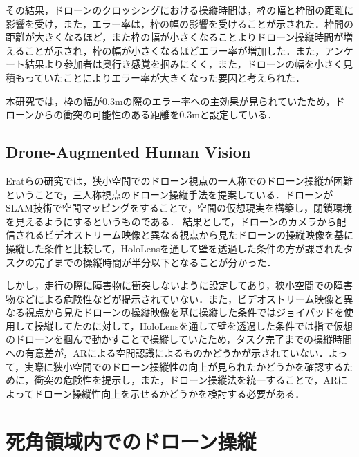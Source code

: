 \documentclass
[a4paper,11pt]{jreport}
\begin{document}
その結果，ドローンのクロッシングにおける操縦時間は，枠の幅と枠間の距離に影響を受け，また，エラー率は，枠の幅の影響を受けることが示された．枠間の距離が大きくなるほど，また枠の幅が小さくなることよりドローン操縦時間が増えることが示され，枠の幅が小さくなるほどエラー率が増加した．また，アンケート結果より参加者は奥行き感覚を掴みにくく，また，ドローンの幅を小さく見積もっていたことによりエラー率が大きくなった要因と考えられた．

本研究では，枠の幅が0.3mの際のエラー率への主効果が見られていたため，ドローンからの衝突の可能性のある距離を0.3mと設定している．

\section{Drone-Augmented Human Vision}
Eratらの研究では，狭小空間でのドローン視点の一人称でのドローン操縦が困難ということで，三人称視点のドローン操縦手法を提案している\cite{AR_drone}．ドローンがSLAM技術で空間マッピングをすることで，空間の仮想現実を構築し，閉鎖環境を見えるようにするというものである．
結果として，ドローンのカメラから配信されるビデオストリーム映像と異なる視点から見たドローンの操縦映像を基に操縦した条件と比較して，HoloLensを通して壁を透過した条件の方が課されたタスクの完了までの操縦時間が半分以下となることが分かった．

しかし，走行の際に障害物に衝突しないように設定してあり，狭小空間での障害物などによる危険性などが提示されていない．また，ビデオストリーム映像と異なる視点から見たドローンの操縦映像を基に操縦した条件ではジョイパッドを使用して操縦してたのに対して，HoloLensを通して壁を透過した条件では指で仮想のドローンを掴んで動かすことで操縦していたため，タスク完了までの操縦時間への有意差が，ARによる空間認識によるものかどうかが示されていない．よって，実際に狭小空間でのドローン操縦性の向上が見られたかどうかを確認するために，衝突の危険性を提示し，また，ドローン操縦法を統一することで，ARによってドローン操縦性向上を示せるかどうかを検討する必要がある．

\chapter{死角領域内でのドローン操縦}


\end{document}
